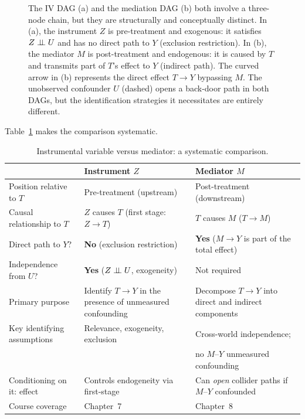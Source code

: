 \documentclass[master.tex]{subfiles}
\begin{document}
\begin{figure}[H]
\begin{tikzpicture}[node distance=1.9cm]
\end{tikzpicture}
\caption{The IV DAG (a) and the mediation DAG (b) both involve a three-node
chain, but they are structurally and conceptually distinct.
In (a), the instrument $Z$ is pre-treatment and exogenous: it satisfies
$Z \perp\!\!\!\perp U$ and has no direct path to $Y$ (exclusion restriction).
In (b), the mediator $M$ is post-treatment and endogenous: it is caused by
$T$ and transmits part of $T$'s effect to $Y$ (indirect path).
The curved arrow in (b) represents the direct effect $T \to Y$ bypassing $M$.
The unobserved confounder $U$ (dashed) opens a back-door path in both DAGs,
but the identification strategies it necessitates are entirely different.}
\label{w1:fig:iv_vs_med}
\end{figure}

Table~\ref{w1:tab:iv_vs_med} makes the comparison systematic.

\begin{table}[ht]
\centering
\renewcommand{\arraystretch}{1.5}
\caption{Instrumental variable versus mediator: a systematic comparison.}
\label{w1:tab:iv_vs_med}
\begin{tabular}{@{}p{3.8cm}p{5.0cm}p{5.0cm}@{}}
\toprule
& \textbf{Instrument} $Z$ & \textbf{Mediator} $M$ \\
\midrule
Position relative to $T$
  & Pre-treatment (upstream)
  & Post-treatment (downstream) \\
Causal relationship to $T$
  & $Z$ causes $T$ (first stage: $Z \to T$)
  & $T$ causes $M$ ($T \to M$) \\
Direct path to $Y$?
  & \textbf{No} (exclusion restriction)
  & \textbf{Yes} ($M \to Y$ is part of the total effect) \\
Independence from $U$?
  & \textbf{Yes} ($Z \perp\!\!\!\perp U$, exogeneity)
  & Not required \\
Primary purpose
  & Identify $T \to Y$ in the presence of unmeasured confounding
  & Decompose $T \to Y$ into direct and indirect components \\
Key identifying assumptions
  & Relevance, exogeneity, exclusion
  & Cross-world independence;\\
  & & no $M$--$Y$ unmeasured confounding \\
Conditioning on it: effect
  & Controls endogeneity via first-stage
  & Can \emph{open} collider paths if $M$--$Y$ confounded \\
Course coverage
  & Chapter~7
  & Chapter~8 \\
\bottomrule
\end{tabular}
\end{table}
\end{document}
